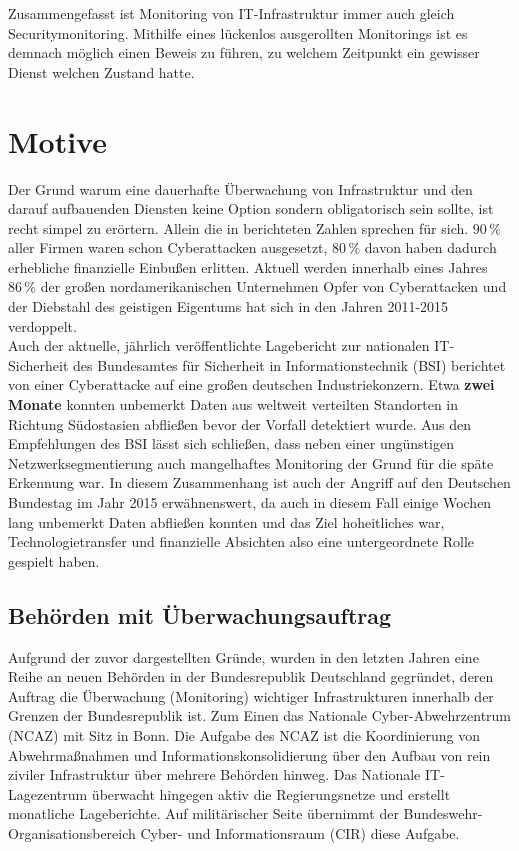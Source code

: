 Zusammengefasst ist Monitoring von IT-Infrastruktur immer auch gleich Securitymonitoring. 
Mithilfe eines lückenlos ausgerollten Monitorings ist es demnach möglich einen Beweis zu 
führen, zu welchem Zeitpunkt ein gewisser Dienst welchen Zustand hatte.
 
\section{Motive}

Der Grund warum eine dauerhafte Überwachung von Infrastruktur und den darauf aufbauenden 
Diensten keine Option sondern obligatorisch sein sollte, ist recht simpel zu erörtern. 
Allein die in \cite[461]{francia} berichteten Zahlen sprechen für sich. $90\,\%$ aller 
Firmen waren schon Cyberattacken ausgesetzt, $80\,\%$ davon haben dadurch erhebliche 
finanzielle Einbußen erlitten. Aktuell werden innerhalb eines Jahres $86\,\%$ der großen 
nordamerikanischen Unternehmen Opfer von Cyberattacken und der Diebstahl des geistigen 
Eigentums hat sich in den Jahren 2011-2015 verdoppelt.\\
Auch der aktuelle, jährlich veröffentlichte Lagebericht zur nationalen IT-Sicherheit des
Bundesamtes für Sicherheit in Informationstechnik (BSI) \cite[12]{bsi-lagebericht} 
berichtet  
von einer Cyberattacke auf eine großen deutschen Industriekonzern. Etwa \textbf{zwei 
Monate} konnten unbemerkt Daten aus weltweit verteilten Standorten in Richtung 
Südostasien abfließen bevor der Vorfall detektiert wurde. Aus den Empfehlungen des BSI 
lässt sich schließen, dass neben einer ungünstigen Netzwerksegmentierung auch 
mangelhaftes Monitoring der Grund für die späte Erkennung war. In diesem Zusammenhang ist 
auch der Angriff auf den Deutschen Bundestag im Jahr 2015 erwähnenswert, da auch in 
diesem Fall einige Wochen lang unbemerkt Daten abfließen konnten und das Ziel 
hoheitliches war, Technologietransfer und finanzielle Absichten also eine untergeordnete 
Rolle gespielt haben.
\subsection{Behörden mit Überwachungsauftrag}

Aufgrund der zuvor dargestellten Gründe, wurden in den letzten Jahren eine Reihe an neuen 
Behörden in der Bundesrepublik Deutschland gegründet, deren Auftrag die Überwachung 
(Monitoring) wichtiger Infrastrukturen innerhalb der Grenzen der Bundesrepublik ist. Zum 
Einen das Nationale Cyber-Abwehrzentrum (NCAZ) \cite{web_ncaz} mit Sitz in Bonn. Die 
Aufgabe des NCAZ ist die Koordinierung von Abwehrmaßnahmen und Informationskonsolidierung 
über den Aufbau von rein ziviler Infrastruktur über mehrere Behörden hinweg. Das 
Nationale IT-Lagezentrum \cite{web_lagezentrum} überwacht hingegen aktiv die 
Regierungsnetze und erstellt monatliche Lageberichte. Auf militärischer Seite übernimmt 
der Bundeswehr-Organisationsbereich Cyber- und Informationsraum (CIR) diese Aufgabe.

